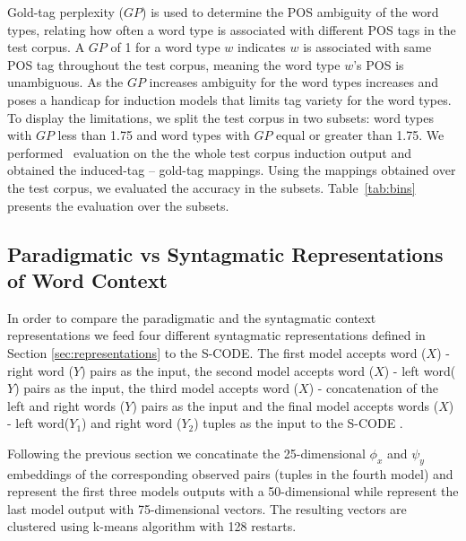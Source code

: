 Gold-tag perplexity ($GP$) is used to determine the POS ambiguity of
the word types, relating how often a word type is associated with
different POS tags in the test corpus.  A $GP$ of 1 for a word type
$w$ indicates $w$ is associated with same POS tag throughout the test
corpus, meaning the word type $w$'s POS is unambiguous.  As the $GP$
increases ambiguity for the word types increases and poses a handicap
for induction models that limits tag variety for the word types.  To
display the limitations, we split the test corpus in two subsets: word
types with $GP$ less than 1.75 and word types with $GP$ equal or greater
than 1.75.  We performed \mto\ evaluation on the the whole test corpus
induction output and obtained the induced-tag -- gold-tag
mappings. Using the mappings obtained over the test corpus, we
evaluated the accuracy in the subsets.  Table~\ref{tab:bins} presents
the evaluation over the subsets.

\subsection{Paradigmatic vs Syntagmatic Representations of Word Context}

In order to compare the paradigmatic and the syntagmatic context
representations we feed four different syntagmatic representations
defined in Section \ref{sec:representations} to the S-CODE.  The first
model accepts word ($X$) - right word ($Y$) pairs as the input, the
second model accepts word ($X$) - left word($Y$) pairs as the input,
the third model accepts word ($X$) - concatenation of the left and
right words ($Y$) pairs as the input \cite{mintz2003frequent} and the
final model accepts words ($X$) - left word($Y_1$) and right word
($Y_2$) tuples as the input to the S-CODE \cite{20674613}.

Following the previous section we concatinate the 25-dimensional
$\phi_x$ and $\psi_y$ embeddings of the corresponding observed pairs
(tuples in the fourth model) and represent the first three models
outputs with a 50-dimensional while represent the last model output
with 75-dimensional vectors.  The resulting vectors are clustered
using k-means algorithm with 128 restarts. 

